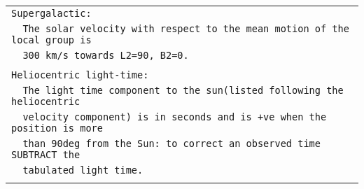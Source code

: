 \begin{center}
\begin{tabular}{|l|}
\verb|Supergalactic:|\\
\verb|  The solar velocity with respect to the mean motion of the local group is|\\
\verb|  300 km/s towards L2=90, B2=0.|\\
\\
\verb|Heliocentric light-time:|\\
\verb|  The light time component to the sun(listed following the heliocentric|\\
\verb|  velocity component) is in seconds and is +ve when the position is more|\\
\verb|  than 90deg from the Sun: to correct an observed time SUBTRACT the|\\
\verb|  tabulated light time.|\\
\\
\hline
\end{tabular}


\end{center}

